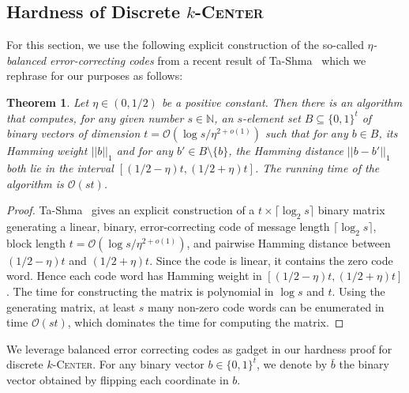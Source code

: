 \documentclass[11pt]{article}
\newtheorem{theorem}{Theorem}[section]
\newcommand{\kc}{\textsc{$k$-Center}\xspace}
\newcommand{\OO}{\mathcal{O}}
\newcommand{\bN}{\ensuremath{\mathbb{N}}\xspace}
\begin{document}
\subsection{Hardness of Discrete \kc}\label{sec:hardness-discrete}


For this section, we use the following explicit construction of the so-called \emph{$\eta$-balanced error-correcting codes} from a recent result of Ta-Shma~\cite{ta-shma17:explicit-balanced-codes} which we rephrase for our purposes as follows:



\begin{theorem}\label{thm:balanced-code}
Let $\eta\in (0,1/2)$ be a positive constant. Then there is an algorithm that computes, for any given number $s\in\bN$, an $s$-element set $B\subseteq\{0,1\}^t$ of binary vectors of dimension $t=\OO(\log s/\eta^{2+o(1)})$ such that for any $b\in  B$, its Hamming weight $||b||_1$ and for any $b'\in B\setminus\{b\}$, the Hamming distance $||b-b'||_1$ both lie in the interval $[(1/2-\eta)t,(1/2+\eta)t]$. The running time of the algorithm is $\OO(st)$.
\end{theorem}
\begin{proof}
    Ta-Shma~\cite{ta-shma17:explicit-balanced-codes} gives an explicit construction of a $t\times \lceil \log_2 s\rceil$ binary matrix generating a linear, binary, error-correcting code of message length $\lceil\log_2 s\rceil$, block length $t=\OO(\log s/\eta^{2+o(1)})$, and pairwise Hamming distance between $(1/2-\eta)t$ and $(1/2+\eta)t$. Since the code is linear, it contains the zero code word. Hence each code word has Hamming weight in $[(1/2-\eta)t, (1/2+\eta)t]$. The time for constructing the matrix is polynomial in $\log s$ and $t$.  Using the generating matrix, at least $s$ many non-zero code words can be enumerated in time $\OO(st)$, which dominates the time for computing the matrix.

\end{proof}


We leverage balanced error correcting codes as gadget in our hardness proof for discrete \kc . For any binary vector $b\in\{0,1\}^t$, we denote by $\bar{b}$ the binary vector obtained by flipping each coordinate in $b$.



\hardnesseuc*
\end{document}
